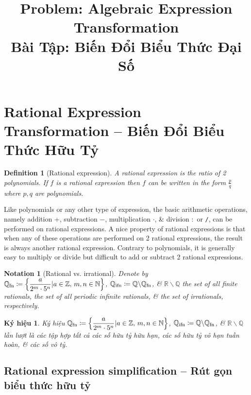 \documentclass{article}
\title{Problem: Algebraic Expression Transformation\\Bài Tập: Biến Đổi Biểu Thức Đại Số}
\date{}
\newtheorem{definition}{Definition}
\newtheorem{kyhieu}{Ký hiệu}
\newtheorem{notation}{Notation}
\begin{document}
\maketitle
\vspace{-2cm}


\section{Rational Expression Transformation -- Biến Đổi Biểu Thức Hữu Tỷ}

\begin{definition}[Rational expression]
	A {\rm rational expression} is the ratio of 2 polynomials. If $f$ is a rational expression then $f$ can be written in the form $\frac{p}{q}$ where $p,q$ are polynomials.
\end{definition}
Like polynomials or any other type of expression, the basic arithmetic operations, namely addition $+$, subtraction $-$, multiplication $\cdot$, \& division $:$ or {\tt/}, can be performed on rational expressions. A nice property of rational expressions is that when any of these operations are performed on 2 rational expressions, the result is always another rational expression. Contrary to polynomials, it is generally easy to multiply or divide but difficult to add or subtract 2 rational expressions.

\begin{notation}[Rational vs. irrational]
	Denote by $\mathbb{Q}_{\rm fn}\coloneqq\left\{\dfrac{a}{2^m\cdot5^n}|a\in\mathbb{Z},\,m,n\in\mathbb{N}\right\}$, $\mathbb{Q}_{\rm ifn}\coloneqq\mathbb{Q}\backslash\mathbb{Q}_{\rm fn}$, \& $\mathbb{R}\backslash\mathbb{Q}$ the set of all finite rationals, the set of all periodic infinite rationals, \& the set of irrationals, respectively.
\end{notation}

\begin{kyhieu}
	Ký hiệu $\mathbb{Q}_{\rm fn}\coloneqq\left\{\dfrac{a}{2^m\cdot5^n}|a\in\mathbb{Z},\,m,n\in\mathbb{N}\right\}$, $\mathbb{Q}_{\rm ifn}\coloneqq\mathbb{Q}\backslash\mathbb{Q}_{\rm fn}$, \& $\mathbb{R}\backslash\mathbb{Q}$ lần lượt là các tập hợp tất cả các số hữu tỷ hữu hạn, các số hữu tỷ vô hạn tuần hoàn, \& các số vô tỷ.
\end{kyhieu}

\subsection{Rational expression simplification -- Rút gọn biểu thức hữu tỷ}
\end{document}
